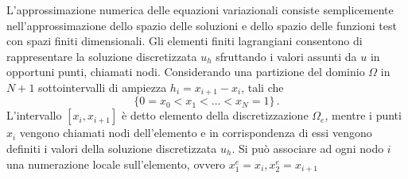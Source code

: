 L'approssimazione numerica delle equazioni variazionali 
consiste semplicemente nell'approssimazione dello spazio 
delle soluzioni e dello spazio delle funzioni test con spazi finiti dimensionali.
Gli elementi finiti lagrangiani consentono di rappresentare 
la soluzione discretizzata $u_{h}$ sfruttando i valori assunti da $u$ in opportuni punti, chiamati nodi.
Considerando una partizione del dominio $\Omega$ in $N+1$ 
sottointervalli di ampiezza $h_{i}=x_{i+1}-x_{i}$, tali che 
\begin{equation}
\{0= x_{0} < x_{1} < \dots < x_{N}=1 \}\,.
\end{equation}
L'intervallo $[x_{i},x_{i+1}]$ è detto elemento della 
discretizzazione $\Omega_{e}$, mentre i punti $x_{i}$ 
vengono chiamati nodi dell'elemento 
e in corrispondenza di essi vengono definiti i valori
della soluzione discretizzata $u_{h}$. 
Si può associare ad ogni nodo $i$ una numerazione 
locale sull'elemento, ovvero  $x_{1}^{e}=x_{i}, x_{2}^{e}=x_{i+1}$

